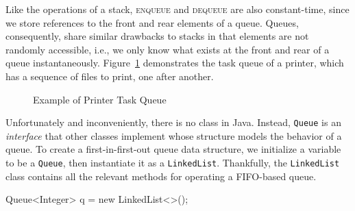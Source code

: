 Like the operations of a stack, \textsc{enqueue} and \textsc{dequeue} are also constant-time, since we store references to the front and rear elements of a queue. 
Queues, consequently, share similar drawbacks to stacks in that elements are not randomly accessible, i.e., we only know what exists at the front and rear of a queue instantaneously. 
Figure~\ref{fig:printerqueue} demonstrates the task queue of a printer, which has a sequence of files to print, one after another.

\begin{figure}[ht]
\begin{center}
\end{center}
\caption{Example of Printer Task Queue}
\label{fig:printerqueue}
\end{figure}

Unfortunately and inconveniently, there is no  class in Java. 
Instead, \texttt{Queue} is an \emph{interface} that other classes implement whose structure models the behavior of a queue. 
To create a first-in-first-out queue data structure, we initialize a variable to be a \texttt{Queue}, then instantiate it as a \texttt{LinkedList}. 
Thankfully, the \texttt{LinkedList} class contains all the relevant methods for operating a FIFO-based queue.

\begin{verbnobox}[\small]
Queue<Integer> q = new LinkedList<>();
\end{verbnobox}

